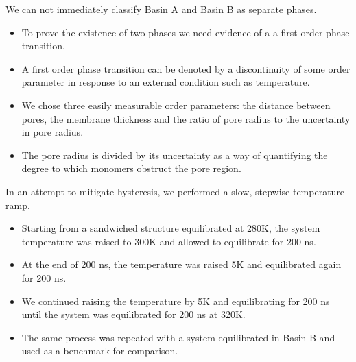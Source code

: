 \documentclass{article}
\begin{document}
  We can not immediately classify Basin A and Basin B as separate phases.
  \begin{itemize}
	\item To prove the existence of two phases we need evidence of a
	a first order phase transition.
	\item A first order phase transition can be denoted by a discontinuity
        of some order parameter in response to an external condition such as
	temperature.
	\item We chose three easily measurable order parameters: the distance
	between pores, the membrane thickness and the ratio of pore radius to
	the uncertainty in pore radius.  %
        \item The pore radius is divided by its uncertainty as a way of quantifying
        the degree to which monomers obstruct the pore region.
  \end{itemize}

  In an attempt to mitigate hysteresis, we performed a slow, stepwise temperature ramp.
  \begin{itemize}
        \item Starting from a sandwiched structure equilibrated at 280K, the system
        temperature was raised to 300K and allowed to equilibrate for 200 ns.
        \item At the end of 200 ns, the temperature was raised 5K and equilibrated
        again for 200 ns.
        \item We continued raising the temperature by 5K and equilibrating for 200 ns
        until the system was equilibrated for 200 ns at 320K.
	\item The same process was repeated with a system equilibrated in Basin B and used
	as a benchmark for comparison. 
  \end{itemize}
\end{document}

